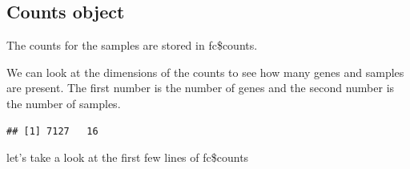 \documentclass[
]{book}
\newenvironment{Shaded}{\begin{snugshade}}{\end{snugshade}}
\newcommand{\FunctionTok}[1]{\textcolor[rgb]{0.13,0.29,0.53}{\textbf{#1}}}
\newcommand{\NormalTok}[1]{#1}
\newcommand{\SpecialCharTok}[1]{\textcolor[rgb]{0.81,0.36,0.00}{\textbf{#1}}}
\begin{document}
\hypertarget{counts-object}{%
\subsection{Counts object}\label{counts-object}}

The counts for the samples are stored in fc\$counts.

We can look at the dimensions of the counts to see how many genes and samples are present. The first number is the number of genes and the second number is the number of samples.

\begin{Shaded}
\end{Shaded}

\begin{verbatim}
## [1] 7127   16
\end{verbatim}

let's take a look at the first few lines of fc\$counts

\begin{Shaded}
\end{Shaded}
\end{document}
